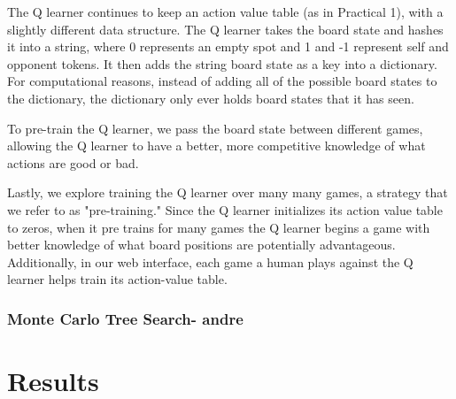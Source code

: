 \documentclass[12pt]{article}
\begin{document}
The Q learner continues to keep an action value table (as in Practical 1), with a slightly different data structure. The Q learner takes the board state and hashes it into a string, where 0 represents an empty spot and 1 and -1 represent self and opponent tokens. It then adds the string board state as a key into a dictionary. For computational reasons, instead of adding all of the possible board states to the dictionary, the dictionary only ever holds board states that it has seen. 

To pre-train the Q learner, we pass the board state between different games, allowing the Q learner to have a better, more competitive knowledge of what actions are good or bad.

Lastly, we explore training the Q learner over many many games, a strategy that we refer to as "pre-training." Since the Q learner initializes its action value table to zeros, when it pre trains for many games the Q learner begins a game with better knowledge of what board positions are potentially advantageous. Additionally, in our web interface, each game a human plays against the Q learner helps train its action-value table.

\subsubsection{Monte Carlo Tree Search- andre} 


\section{Results}
\end{document}
